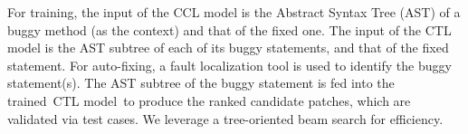 
%


For training, the input of the CCL model is the Abstract Syntax Tree
(AST) of a buggy method (as the context) and that of the fixed one.
The input of the CTL model is the AST subtree of each of its buggy
statements, and that of the fixed statement. For
auto-fixing, a fault localization tool is used to identify the buggy
statement(s). The AST subtree of the buggy statement is fed into the
trained~CTL model~to produce the ranked candidate patches, which are
validated via test cases. We leverage a tree-oriented beam search for
efficiency.



